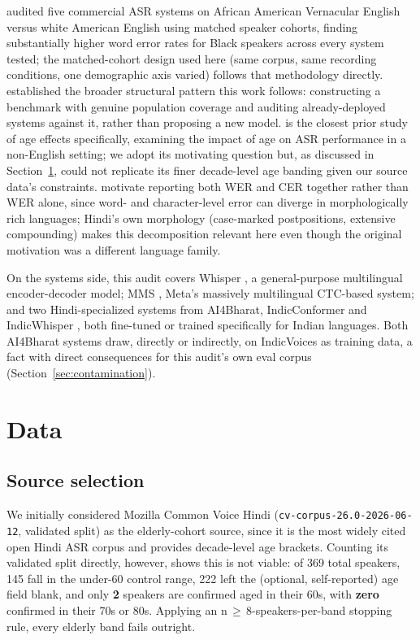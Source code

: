 \documentclass[11pt]{article}
\begin{document}
\citet{koenecke2020racial} audited five commercial ASR systems on African American Vernacular
English versus white American English using matched speaker cohorts, finding substantially higher
word error rates for Black speakers across every system tested; the matched-cohort design used
here (same corpus, same recording conditions, one demographic axis varied) follows that
methodology directly. \citet{buolamwini2018gender} established the broader structural pattern this
work follows: constructing a benchmark with genuine population coverage and auditing already-deployed
systems against it, rather than proposing a new model. \citet{pellegrini2012impact} is the closest
prior study of age effects specifically, examining the impact of age on ASR performance in a
non-English setting; we adopt its motivating question but, as discussed in
Section~\ref{sec:data}, could not replicate its finer decade-level age banding given our source
data's constraints. \citet{thennal2025cer} motivate reporting both WER and CER together
rather than WER alone, since word- and character-level error can diverge in morphologically rich
languages; Hindi's own morphology (case-marked postpositions, extensive compounding) makes this
decomposition relevant here even though the original motivation was a different language family.

On the systems side, this audit covers Whisper \citep{radford2023whisper}, a general-purpose
multilingual encoder-decoder model; MMS \citep{pratap2023mms}, Meta's massively multilingual
CTC-based system; and two Hindi-specialized systems from AI4Bharat, IndicConformer
\citep{indicconformer2025} and IndicWhisper \citep{bhogale2023vistaar}, both fine-tuned or trained
specifically for Indian languages. Both AI4Bharat systems draw, directly or indirectly, on
IndicVoices \citep{indicvoices2024} as training data, a fact with direct consequences for this
audit's own eval corpus (Section~\ref{sec:contamination}).

\section{Data}
\label{sec:data}

\subsection{Source selection}

We initially considered Mozilla Common Voice Hindi (\texttt{cv-corpus-26.0-2026-06-12},
validated split) as the elderly-cohort source, since it is the most widely cited open Hindi ASR
corpus and provides decade-level age brackets. Counting its validated split directly, however,
shows this is not viable: of 369 total speakers, 145 fall in the under-60 control range, 222 left
the (optional, self-reported) age field blank, and only \textbf{2} speakers are confirmed aged in
their 60s, with \textbf{zero} confirmed in their 70s or 80s. Applying an n$\,\geq\,$8-speakers-per-band
stopping rule, every elderly band fails outright.
\end{document}
